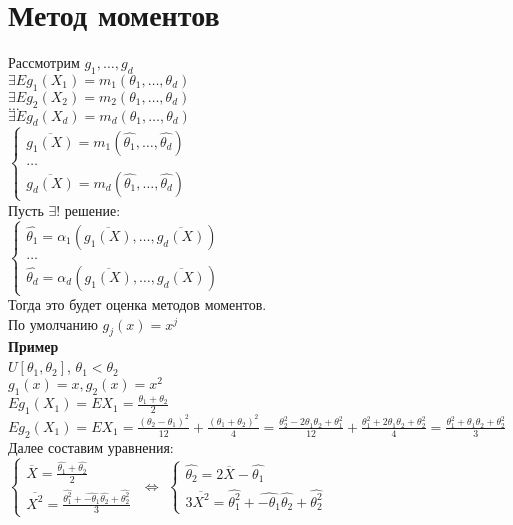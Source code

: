 \documentclass{article}
\newcommand\0{\mathbb{0}}
\newcommand\1{\mathbb{1}}
\begin{document}
\section{Метод моментов}
Рассмотрим $g_1, \dots, g_d$\\
$\exists Eg_1(X_1) = m_1(\theta_1, \dots, \theta_d)$\\
$\exists Eg_2(X_2) = m_2(\theta_1, \dots, \theta_d)$\\
$\dots$\\
$\exists Eg_d(X_d) = m_d(\theta_1, \dots, \theta_d)$\\
$\begin{cases}
\overline{g_1(X)} = m_1(\widehat{\theta_1}, \dots, \widehat{\theta_d})\\
\dots\\
\overline{g_d(X)} = m_d(\widehat{\theta_1}, \dots, \widehat{\theta_d})
\end{cases}$\\
Пусть $\exists!$ решение:\\
$\begin{cases}
\widehat{\theta_1} = \alpha_1(\overline{g_1(X)}, \dots, \overline{g_d(X)})\\
\dots\\
\widehat{\theta_d} = \alpha_d(\overline{g_1(X)}, \dots, \overline{g_d(X)})
\end{cases}$\\
Тогда это будет оценка методов моментов.\\
По умолчанию $g_j(x) = x^j$\\
\textbf{Пример}\\
$U[\theta_1, \theta_2]$, $\theta_1 < \theta_2$\\
$g_1(x) = x, g_2(x) = x^2$\\
$Eg_1(X_1) = EX_1 = \frac{\theta_1 + \theta_2}{2}$\\
$Eg_2(X_1) = EX_1 = \frac{(\theta_2 - \theta_1)^2}{12} + \frac{(\theta_1 + \theta_2)^2}{4} = \frac{\theta_2^2 - 2\theta_1\theta_2 + \theta_1^2}{12} + \frac{\theta_1^2 + 2\theta_1\theta_2 + \theta_2^2}{4} = \frac{\theta_1^2 + \theta_1\theta_2 + \theta_2^2}{3}$\\
Далее составим уравнения:\\
$\begin{cases}
\overline{X} = \frac{\widehat{\theta_1} + \widehat{\theta_2}}{2}\\
\overline{X^2} = \frac{\widehat{\theta_1^2} + \widehat{-\theta_1}\widehat{\theta_2} + \widehat{\theta_2^2}}{3}
\end{cases}$ $\Leftrightarrow$ $\begin{cases}
    \widehat{\theta_2} = 2\overline{X} - \widehat{\theta_1}\\
    3\overline{X^2} = \widehat{\theta_1^2} + \widehat{-\theta_1}\widehat{\theta_2} + \widehat{\theta_2^2}
\end{cases}$\\
\end{document}
